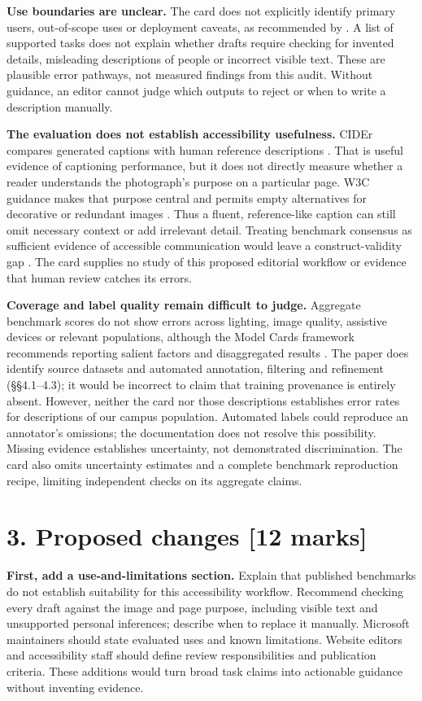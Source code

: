 \documentclass[11pt,letterpaper]{article}
\begin{document}
\textbf{Use boundaries are unclear.} The card does not explicitly identify primary users, out-of-scope uses or deployment caveats, as recommended by \citet[\S\S4.2, 4.8--4.9]{mitchell2019}. A list of supported tasks does not explain whether drafts require checking for invented details, misleading descriptions of people or incorrect visible text. These are plausible error pathways, not measured findings from this audit. Without guidance, an editor cannot judge which outputs to reject or when to write a description manually.

\textbf{The evaluation does not establish accessibility usefulness.} CIDEr compares generated captions with human reference descriptions \citep{vedantam2015}. That is useful evidence of captioning performance, but it does not directly measure whether a reader understands the photograph's purpose on a particular page. W3C guidance makes that purpose central and permits empty alternatives for decorative or redundant images \citep{w3c2024}. Thus a fluent, reference-like caption can still omit necessary context or add irrelevant detail. Treating benchmark consensus as sufficient evidence of accessible communication would leave a construct-validity gap \citep[\S3.2]{jacobs2021}. The card supplies no study of this proposed editorial workflow or evidence that human review catches its errors.

\newpage
\textbf{Coverage and label quality remain difficult to judge.} Aggregate benchmark scores do not show errors across lighting, image quality, assistive devices or relevant populations, although the Model Cards framework recommends reporting salient factors and disaggregated results \citep[\S\S4.3, 4.7]{mitchell2019}. The paper does identify source datasets and automated annotation, filtering and refinement (\S\S4.1--4.3); it would be incorrect to claim that training provenance is entirely absent. However, neither the card nor those descriptions establishes error rates for descriptions of our campus population. Automated labels could reproduce an annotator's omissions; the documentation does not resolve this possibility. Missing evidence establishes uncertainty, not demonstrated discrimination. The card also omits uncertainty estimates and a complete benchmark reproduction recipe, limiting independent checks on its aggregate claims.

\section*{3. Proposed changes [12 marks]}
\textbf{First, add a use-and-limitations section.} Explain that published benchmarks do not establish suitability for this accessibility workflow. Recommend checking every draft against the image and page purpose, including visible text and unsupported personal inferences; describe when to replace it manually. Microsoft maintainers should state evaluated uses and known limitations. Website editors and accessibility staff should define review responsibilities and publication criteria. These additions would turn broad task claims into actionable guidance without inventing evidence.
\end{document}
